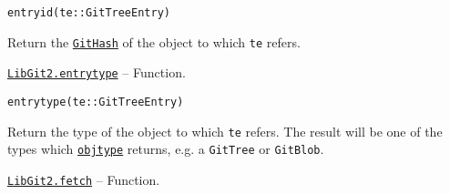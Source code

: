 \begin{adjustwidth}{2em}{0pt}


\begin{verbatim}
entryid(te::GitTreeEntry)
\end{verbatim}

Return the \hyperlink{202290709580230708}{\texttt{GitHash}} of the object to which \texttt{te} refers.



\end{adjustwidth}
\hypertarget{5430515144387502914}{} 
\hyperlink{5430515144387502914}{\texttt{LibGit2.entrytype}}  -- {Function.}

\begin{adjustwidth}{2em}{0pt}


\begin{verbatim}
entrytype(te::GitTreeEntry)
\end{verbatim}

Return the type of the object to which \texttt{te} refers. The result will be one of the types which \hyperlink{5024227788763319693}{\texttt{objtype}} returns, e.g. a \texttt{GitTree} or \texttt{GitBlob}.



\end{adjustwidth}
\hypertarget{538444501253561978}{} 
\hyperlink{538444501253561978}{\texttt{LibGit2.fetch}}  -- {Function.}

